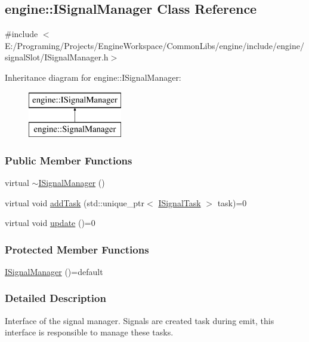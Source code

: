 \hypertarget{a00051}{}\subsection{engine\+:\+:I\+Signal\+Manager Class Reference}
\label{a00051}


{\ttfamily \#include $<$E\+:/\+Programing/\+Projects/\+Engine\+Workspace/\+Common\+Libs/engine/include/engine/signal\+Slot/\+I\+Signal\+Manager.\+h$>$}

Inheritance diagram for engine\+:\+:I\+Signal\+Manager\+:\begin{figure}[H]
\begin{center}
\leavevmode
\includegraphics[height=2.000000cm]{a00051}
\end{center}
\end{figure}
\subsubsection*{Public Member Functions}
\begin{DoxyCompactItemize}
\item 
virtual \hyperlink{a00051_a96df44c1e1235d42d5632a5138d684e0}{$\sim$\+I\+Signal\+Manager} ()
\item 
virtual void \hyperlink{a00051_a45dd8b6dff3657f3538946bf1a8ea77c}{add\+Task} (std\+::unique\+\_\+ptr$<$ \hyperlink{a00052}{I\+Signal\+Task} $>$ task)=0
\item 
virtual void \hyperlink{a00051_ab28b704d755b789e6f88d7c30e2aa625}{update} ()=0
\end{DoxyCompactItemize}
\subsubsection*{Protected Member Functions}
\begin{DoxyCompactItemize}
\item 
\hyperlink{a00051_a2ff4db6b18c05b22db35c9d62bed82bc}{I\+Signal\+Manager} ()=default
\end{DoxyCompactItemize}


\subsubsection{Detailed Description}
Interface of the signal manager. Signals are created task during emit, this interface is responsible to manage these tasks. 

